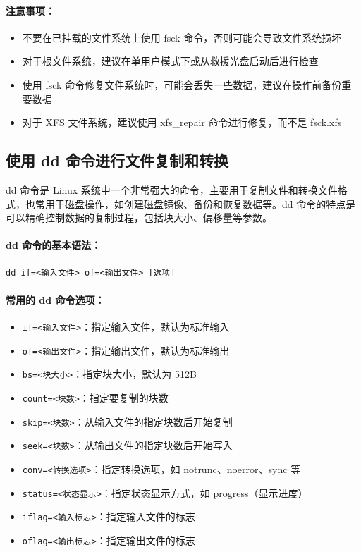 \documentclass[12pt,UTF8]{ctexbook}
\begin{document}
\paragraph{注意事项：}
\begin{itemize}
    \item 不要在已挂载的文件系统上使用 fsck 命令，否则可能会导致文件系统损坏
    \item 对于根文件系统，建议在单用户模式下或从救援光盘启动后进行检查
    \item 使用 fsck 命令修复文件系统时，可能会丢失一些数据，建议在操作前备份重要数据
    \item 对于 XFS 文件系统，建议使用 xfs\_repair 命令进行修复，而不是 fsck.xfs
\end{itemize}

\subsection{使用 dd 命令进行文件复制和转换}
\label{dd\_command}

dd 命令是 Linux 系统中一个非常强大的命令，主要用于复制文件和转换文件格式，也常用于磁盘操作，如创建磁盘镜像、备份和恢复数据等。dd 命令的特点是可以精确控制数据的复制过程，包括块大小、偏移量等参数。

\paragraph{dd 命令的基本语法：}
\begin{verbatim}
dd if=<输入文件> of=<输出文件> [选项]
\end{verbatim}

\paragraph{常用的 dd 命令选项：}
\begin{itemize}
    \item \verb+if=<输入文件>+：指定输入文件，默认为标准输入
    \item \verb+of=<输出文件>+：指定输出文件，默认为标准输出
    \item \verb+bs=<块大小>+：指定块大小，默认为 512B
    \item \verb+count=<块数>+：指定要复制的块数
    \item \verb+skip=<块数>+：从输入文件的指定块数后开始复制
    \item \verb+seek=<块数>+：从输出文件的指定块数后开始写入
    \item \verb+conv=<转换选项>+：指定转换选项，如 notrunc、noerror、sync 等
    \item \verb+status=<状态显示>+：指定状态显示方式，如 progress（显示进度）
    \item \verb+iflag=<输入标志>+：指定输入文件的标志
    \item \verb+oflag=<输出标志>+：指定输出文件的标志
\end{itemize}
\end{document}
